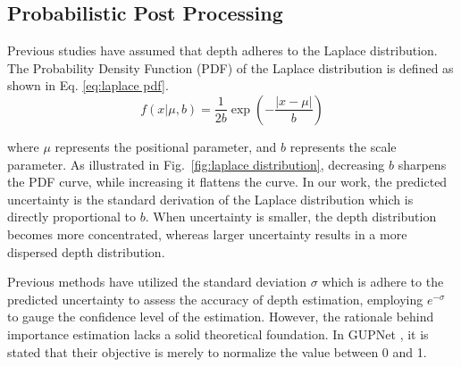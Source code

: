 \documentclass[journal]{IEEEtran}
\begin{document}
	\subsection{Probabilistic Post Processing}\label{post_processing}
		Previous studies have assumed that depth adheres to the Laplace distribution. The Probability Density Function (PDF) of the Laplace distribution is defined as shown in Eq. \eqref{eq:laplace pdf}. 
		\begin{equation}
			f(x|\mu,b)=\frac1{2b}\exp\left(-\frac{|x-\mu|}b\right)
			\label{eq:laplace pdf}
		\end{equation}
		
		where $\mu$ represents the positional parameter, and $b$ represents the scale parameter. As illustrated in Fig.~\ref{fig:laplace distribution}, decreasing $b$ sharpens the PDF curve, while increasing it flattens the curve. In our work, the predicted uncertainty is the standard derivation of the Laplace distribution which is directly proportional to $b$. When uncertainty is smaller, the depth distribution becomes more concentrated, whereas larger uncertainty results in a more dispersed depth distribution.
		
		Previous methods have utilized the standard deviation $\sigma$ which is adhere to the predicted uncertainty to assess the accuracy of depth estimation, employing $e^{-\sigma}$ to gauge the confidence level of the estimation. However, the rationale behind importance estimation lacks a solid theoretical foundation. In GUPNet \cite{gupnet}, it is stated that their objective is merely to normalize the value between 0 and 1.
		
\end{document}
